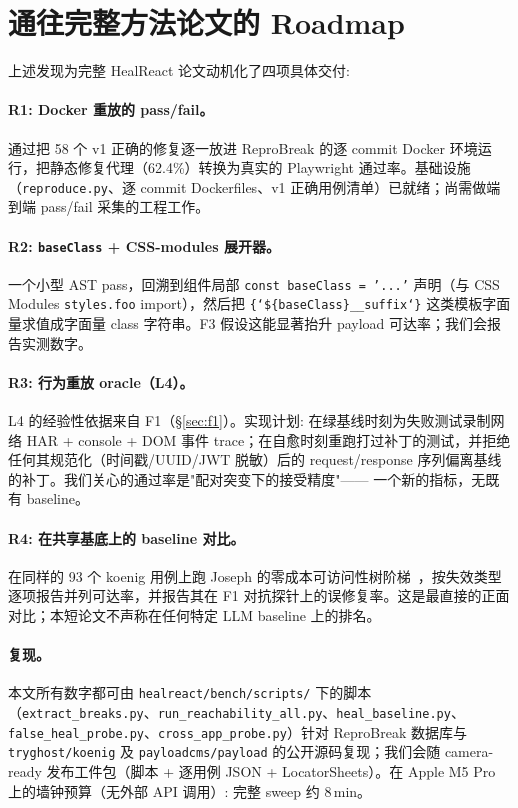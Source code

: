 \section{通往完整方法论文的 Roadmap}
\label{sec:roadmap}

上述发现为完整 HealReact 论文动机化了四项具体交付:

\paragraph{R1: Docker 重放的 pass/fail。}
通过把 58 个 v1 正确的修复逐一放进 ReproBreak 的逐 commit Docker 环境运行，把静态修复代理（62.4\%）转换为真实的 Playwright 通过率。基础设施（\texttt{reproduce.py}、逐 commit Dockerfiles、v1 正确用例清单）已就绪；尚需做端到端 pass/fail 采集的工程工作。

\paragraph{R2: \texttt{baseClass} + CSS-modules 展开器。}
一个小型 AST pass，回溯到组件局部 \texttt{const baseClass = '...'} 声明（与 CSS Modules \texttt{styles.foo} import），然后把 \texttt{\{`\$\{baseClass\}\_\_suffix`\}} 这类模板字面量求值成字面量 class 字符串。F3 假设这能显著抬升 payload 可达率；我们会报告实测数字。

\paragraph{R3: 行为重放 oracle（L4）。}
L4 的经验性依据来自 F1（\S\ref{sec:f1}）。实现计划: 在绿基线时刻为失败测试录制网络 HAR + console + DOM 事件 trace；在自愈时刻重跑打过补丁的测试，并拒绝任何其规范化（时间戳/UUID/JWT 脱敏）后的 request/response 序列偏离基线的补丁。我们关心的通过率是"配对突变下的接受精度"—— 一个新的指标，无既有 baseline。

\paragraph{R4: 在共享基底上的 baseline 对比。}
在同样的 93 个 koenig 用例上跑 Joseph 的零成本可访问性树阶梯~\cite{joseph2026zerocost}，按失效类型逐项报告并列可达率，并报告其在 F1 对抗探针上的误修复率。这是最直接的正面对比；本短论文不声称在任何特定 LLM baseline 上的排名。

\paragraph{复现。}
本文所有数字都可由 \texttt{healreact/bench/scripts/} 下的脚本（\texttt{extract\_breaks.py}、\texttt{run\_reachability\_all.py}、\texttt{heal\_baseline.py}、\texttt{false\_heal\_probe.py}、\texttt{cross\_app\_probe.py}）针对 ReproBreak 数据库与 \texttt{tryghost/koenig} 及 \texttt{payloadcms/payload} 的公开源码复现；我们会随 camera-ready 发布工件包（脚本 + 逐用例 JSON + LocatorSheets）。在 Apple M5 Pro 上的墙钟预算（无外部 API 调用）: 完整 sweep 约 8\,min。

